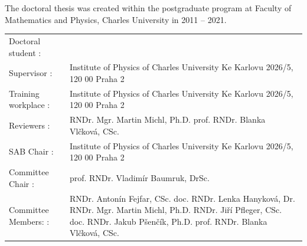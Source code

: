 
\openright
\hypersetup{pageanchor=true}
\pagestyle{plain}


\noindent
The doctoral thesis was created within the postgraduate program at Faculty of
Mathematics and Physics, Charles University in 2011 -- 2021.

\vspace{10mm}
{%
\setlength{\defaultaddspace}{3mm}%
\noindent%
\begin{tabularx}{\textwidth}{@{}l<{:}X@{}}
Doctoral student
	& \ThesisAuthor \\
\addlinespace

Supervisor
	& \Supervisor \newline
	  Institute of Physics of Charles University \newline
		Ke Karlovu 2026/5, 120 00 Praha 2 \\
\addlinespace

Training workplace
	& Institute of Physics of Charles University \newline
		Ke Karlovu 2026/5, 120 00 Praha 2 \\
\addlinespace

Reviewers
	& RNDr. Mgr. Martin Michl, Ph.D. \newline
	  prof. RNDr. Blanka Vlčková, CSc. \\
\addlinespace

SAB Chair
	& \Supervisor \newline
	  Institute of Physics of Charles University \newline
		Ke Karlovu 2026/5, 120 00 Praha 2 \\
\addlinespace

Committee Chair
	& prof. RNDr. Vladimír Baumruk, DrSc. \\
\addlinespace

Committee Members:
	& RNDr. Antonín Fejfar, CSc. \newline
	  doc. RNDr. Lenka Hanyková, Dr. \newline
	  RNDr. Mgr. Martin Michl, Ph.D. \newline
	  RNDr. Jiří Pfleger, CSc. \newline
	  doc. RNDr. Jakub Pšenčík, Ph.D. \newline
	  prof. RNDr. Blanka Vlčková, CSc. \\

\end{tabularx}
}
\vspace{10mm}

